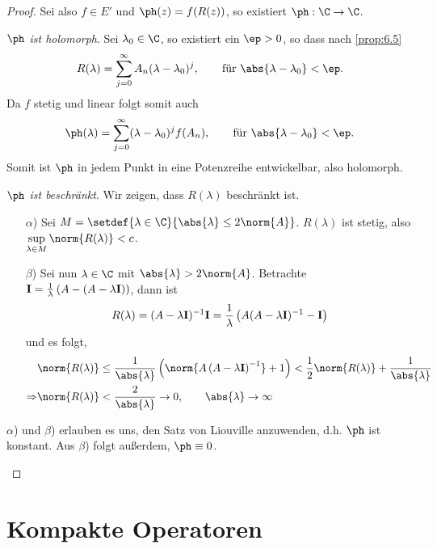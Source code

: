 \begin{proof}
Sei also $f\in E'$ und $\ph(z)=f(R(z))$, so existiert $\ph:\C\to\C$.
\begin{defnenum}
  \item \textit{$\ph$ ist holomorph}. Sei $\lambda_0\in\C$, so existiert ein
  $\ep >0$, so dass nach \ref{prop:6.5}
\begin{align*}
R(\lambda) = \sum\limits_{j=0}^\infty A_n (\lambda-\lambda_0)^j,\qquad
\text{für } \abs{\lambda-\lambda_0}<\ep.
\end{align*}
Da $f$ stetig und linear folgt somit auch
\begin{align*}
\ph(\lambda) = \sum\limits_{j=0}^\infty (\lambda-\lambda_0)^j f(A_n),\qquad
\text{für } \abs{\lambda-\lambda_0}<\ep.
\end{align*}
Somit ist $\ph$ in jedem Punkt in eine Potenzreihe entwickelbar, also holomorph.
\item \textit{$\ph$ ist beschränkt}. Wir zeigen, dass $R(\lambda)$ beschränkt
ist.
\begin{enumerate}
  \item[$\alpha$)]
Sei $M=\setdef{\lambda\in\C}{\abs{\lambda}\le2\norm{A}}$. $R(\lambda)$ ist
stetig, also $\sup\limits_{\lambda\in M} \norm{R(\lambda)}<c$.
  \item[$\beta$)]
Sei nun $\lambda\in\C$ mit $\abs{\lambda}>2\norm{A}$. Betrachte $\mathbf{I} =
\frac{1}{\lambda}\left(A-(A-\lambda\mathbf{I})\right)$, dann ist
\begin{align*}
R(\lambda) = (A-\lambda\mathbf{I})^{-1}\mathbf{I} =
\frac{1}{\lambda}\left(A(A-\lambda\mathbf{I})^{-1} - \mathbf{I}\right)
\end{align*}
und es folgt,
\begin{align*}
&\norm{R(\lambda)} 
\le \frac{1}{\abs{\lambda}}\left(\norm{A\left(A-\lambda\Id\right)^{-1}}+1\right)
< \frac{1}{2}\norm{R(\lambda)} + \frac{1}{\abs{\lambda}}\\
\Rightarrow &\norm{R(\lambda)} < \frac{2}{\abs{\lambda}}\to 0,\qquad
\abs{\lambda}\to
\infty
\end{align*}
\end{enumerate}
$\alpha$) und $\beta$) erlauben es uns, den Satz von Liouville anzuwenden, d.h.
$\ph$ ist konstant. Aus $\beta$) folgt außerdem, $\ph\equiv0$.\qedhere
\end{defnenum} 
\end{proof}

\section{Kompakte Operatoren}

